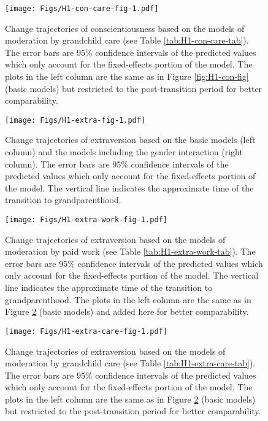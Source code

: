 \documentclass[
  english,
  man, noextraspace]{apa7}
\begin{document}
\begin{appendix}
\begin{figure}
\centering
\texttt{[image: Figs/H1-con-care-fig-1.pdf]}
\caption{\label{fig:H1-con-care-fig}Change trajectories of conscientiousness based
on the models of moderation by grandchild care (see Table
\ref{tab:H1-con-care-tab}). The error bars are 95\% confidence intervals
of the predicted values which only account for the fixed-effects portion
of the model. The plots in the left column are the same as in Figure
\ref{fig:H1-con-fig} (basic models) but restricted to the
post-transition period for better comparability.}
\end{figure}








\begin{figure}
\centering
\texttt{[image: Figs/H1-extra-fig-1.pdf]}
\caption{\label{fig:H1-extra-fig}Change trajectories of extraversion based on the
basic models (left column) and the models including the gender
interaction (right column). The error bars are 95\% confidence intervals
of the predicted values which only account for the fixed-effects portion
of the model. The vertical line indicates the approximate time of the
transition to grandparenthood.}
\end{figure}










\begin{figure}
\centering
\texttt{[image: Figs/H1-extra-work-fig-1.pdf]}
\caption{\label{fig:H1-extra-work-fig}Change trajectories of extraversion based on
the models of moderation by paid work (see Table
\ref{tab:H1-extra-work-tab}). The error bars are 95\% confidence
intervals of the predicted values which only account for the
fixed-effects portion of the model. The vertical line indicates the
approximate time of the transition to grandparenthood. The plots in the
left column are the same as in Figure \ref{fig:H1-extra-fig} (basic
models) and added here for better comparability.}
\end{figure}









\begin{figure}
\centering
\texttt{[image: Figs/H1-extra-care-fig-1.pdf]}
\caption{\label{fig:H1-extra-care-fig}Change trajectories of extraversion based on
the models of moderation by grandchild care (see Table
\ref{tab:H1-extra-care-tab}). The error bars are 95\% confidence
intervals of the predicted values which only account for the
fixed-effects portion of the model. The plots in the left column are the
same as in Figure \ref{fig:H1-extra-fig} (basic models) but restricted
to the post-transition period for better comparability.}
\end{figure}









\end{appendix}
\end{document}
